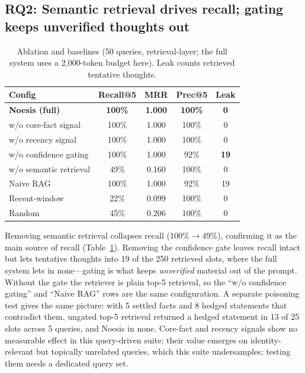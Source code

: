 \documentclass[11pt]{article}
\begin{document}
\subsection{RQ2: Semantic retrieval drives recall; gating keeps unverified thoughts out}
\label{sec:ablation}

\begin{table}[!htbp]
  \centering
  \caption{Ablation and baselines (50 queries, retrieval-layer; the full
  system uses a 2{,}000-token budget here). Leak counts retrieved tentative
  thoughts.}
  \label{tab:ablation}
  \begin{tabular}{lcccc}
    \toprule
    \textbf{Config} & \textbf{Recall@5} & \textbf{MRR} & \textbf{Prec@5} & \textbf{Leak} \\
    \midrule
    \textbf{Noesis (full)}   & \textbf{100\%} & \textbf{1.000} & \textbf{100\%} & \textbf{0} \\
    w/o core-fact signal     & 100\% & 1.000 & 100\% & 0 \\
    w/o recency signal       & 100\% & 1.000 & 100\% & 0 \\
    w/o confidence gating    & 100\% & 1.000 & 92\% & \textbf{19} \\
    w/o semantic retrieval   & 49\%  & 0.160 & 100\% & 0 \\
    \midrule
    Naive RAG                & 100\% & 1.000 & 92\% & 19 \\
    Recent-window            & 22\%  & 0.099 & 100\% & 0 \\
    Random                   & 45\%  & 0.206 & 100\% & 0 \\
    \bottomrule
  \end{tabular}
\end{table}

Removing semantic retrieval collapses recall (100\%$\to$49\%), confirming it
as the main source of recall (Table~\ref{tab:ablation}). Removing the
confidence gate leaves recall intact but lets tentative thoughts into 19 of
the 250 retrieved slots, where the full system lets in none---gating is what
keeps \emph{unverified} material out of the prompt. Without the gate the
retriever is plain top-5 retrieval, so the ``w/o confidence gating'' and
``Naive RAG'' rows are the same configuration. A separate poisoning test
gives the same picture: with 5 settled facts and 8 hedged statements that
contradict them, ungated top-5 retrieval returned a hedged statement in 13 of
25 slots across 5 queries, and Noesis in none.
Core-fact and recency signals show no measurable effect in this query-driven
suite; their value emerges on identity-relevant but topically unrelated
queries, which this suite undersamples; testing them needs a dedicated query
set.
\end{document}
